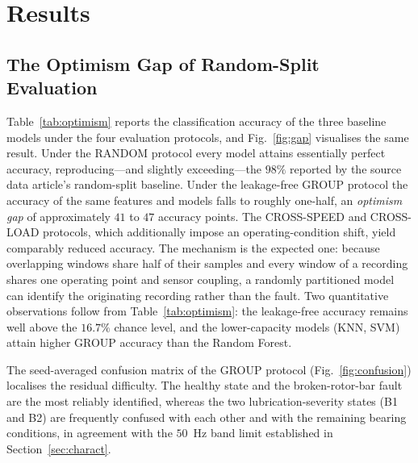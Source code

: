 \providecommand{\cmark}{\ding{51}}
\providecommand{\xmark}{\ding{55}}

\section{Results}
\label{sec:results}

\subsection{The Optimism Gap of Random-Split Evaluation}
\label{subsec:gap}
Table~\ref{tab:optimism} reports the classification accuracy of the three
baseline models under the four evaluation protocols, and Fig.~\ref{fig:gap}
visualises the same result. Under the RANDOM protocol every model attains
essentially perfect accuracy, reproducing---and slightly exceeding---the $98\%$
reported by the source data article's random-split baseline. Under the
leakage-free GROUP protocol the accuracy of the same features and models falls to
roughly one-half, an \emph{optimism gap} of approximately $41$ to $47$ accuracy
points.
The CROSS-SPEED and CROSS-LOAD protocols, which additionally impose an
operating-condition shift, yield comparably reduced accuracy. The mechanism is
the expected one: because overlapping windows share half of their samples and
every window of a recording shares one operating point and sensor coupling, a
randomly partitioned model can identify the originating recording rather than the
fault. Two quantitative observations follow from Table~\ref{tab:optimism}: the
leakage-free accuracy remains well above the $16.7\%$ chance level, and the
lower-capacity models (KNN, SVM) attain higher GROUP accuracy than the Random
Forest.

The seed-averaged confusion matrix of the GROUP protocol
(Fig.~\ref{fig:confusion}) localises the residual difficulty. The healthy state
and the broken-rotor-bar fault are the most reliably identified, whereas the two
lubrication-severity states (B1 and B2) are frequently confused with each other
and with the remaining bearing conditions, in agreement with the $50$~Hz
band limit established in Section~\ref{sec:charact}.

